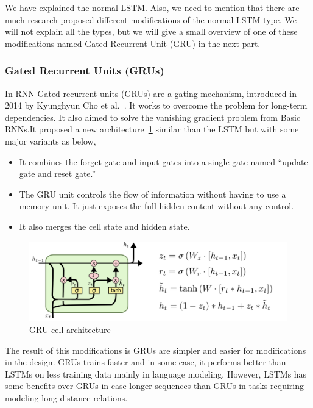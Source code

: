     
    We have explained the normal LSTM. Also, we need to mention that there are much research proposed different modifications of the normal LSTM type. We will not explain all the types, but we will give a small overview of one of these modifications named Gated Recurrent Unit (GRU) in the next part.
\newpage
\subsubsection{Gated Recurrent Units (GRUs)}

In RNN Gated recurrent units (GRUs) are a gating mechanism, introduced in 2014 by Kyunghyun Cho et al.~\cite{Cho_et_al}. It works to overcome the problem for long-term dependencies. It also aimed to solve the vanishing gradient problem from Basic RNNs.It proposed a new architecture~\ref{fig:GRU} similar than the LSTM but with some major variants as below,
\begin{itemize}
  
\item It combines the forget gate and input gates into a single gate named “update gate and reset gate.”
\item The GRU unit controls the flow of information without having to use a memory unit. It just exposes the full hidden content without any control.
\item It also merges the cell state and hidden state.
  
\end{itemize}
\begin{figure}[ht!]
  \centering
  \includegraphics[width=\textwidth]{./Figures/Ch_2_Background/GRU.png}
        \caption{GRU cell architecture~\cite{colah}}
        \label{fig:GRU}
      \end{figure}


The result of this modifications is GRUs are simpler and easier for modifications in the design. GRUs trains faster and in some case, it performs better than LSTMs on less training data mainly in language modeling. However, LSTMs has some benefits over GRUs in case longer sequences than GRUs in tasks requiring modeling long-distance relations. 


